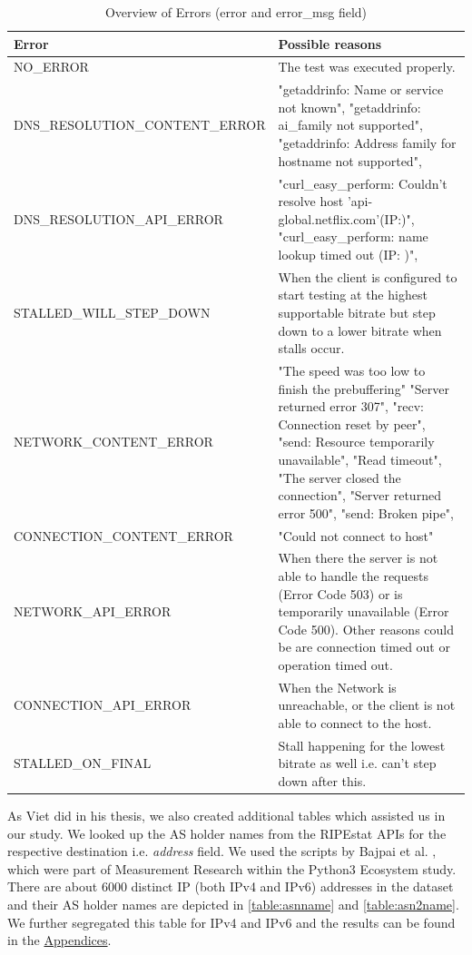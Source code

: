 \begin{table}[!ht]
	\centering
	\caption{Overview of Errors (error and error\_msg field)}
	\label{table:errors}
	\begin{tabular}{lp{8cm}}
  		\toprule
  		\textbf{Error} & \textbf{Possible reasons} \\ 
  		\midrule
  		NO\_ERROR & The test was executed properly. \\ 
  		DNS\_RESOLUTION\_CONTENT\_ERROR & "getaddrinfo: Name or service not known", 
"getaddrinfo: ai\_family not supported", 
"getaddrinfo: Address family for hostname not supported", 
 \\ 
		DNS\_RESOLUTION\_API\_ERROR & "curl\_easy\_perform: Couldn't resolve host 'api-global.netflix.com'(IP:)", 
"curl\_easy\_perform: name lookup timed out (IP: )", 
 \\ 
		STALLED\_WILL\_STEP\_DOWN & When the client is configured to start testing at the highest supportable bitrate but step down to a lower bitrate when stalls occur. \\ 
		NETWORK\_CONTENT\_ERROR & "The speed was too low to finish the prebuffering"
"Server returned error 307", 
"recv: Connection reset by peer", 
"send: Resource temporarily unavailable", 
"Read timeout", 
"The server closed the connection", 
"Server returned error 500", 
"send: Broken pipe", 
 \\ 
		CONNECTION\_CONTENT\_ERROR & "Could not connect to host"
 \\ 
		NETWORK\_API\_ERROR & When there the server is not able to handle the requests (Error Code 503) or is temporarily unavailable (Error Code 500). Other reasons could be are connection timed out or operation timed out.  \\  
		CONNECTION\_API\_ERROR & When the Network is unreachable, or the client is not able to connect to the host.  \\ 
		STALLED\_ON\_FINAL & Stall happening for the lowest bitrate as well i.e. can’t step down after this. \\
  		\bottomrule
\end{tabular}
\end{table}

\FloatBarrier

As Viet \cite{viet} did in his thesis, we also created additional tables which assisted us in our study. 
We looked up the AS holder names from the RIPEstat \cite{ripestat} APIs for the respective destination i.e. \textit{address} field. We used the scripts by Bajpai et al. \cite{bajpairipe}, 
which were part of Measurement Research within the Python3 Ecosystem study. There are about 6000 distinct IP (both IPv4 and IPv6) addresses in the dataset and their AS holder names are depicted in \cref{table:asnname} and \cref{table:asn2name}. We further segregated this table for IPv4 and IPv6 and the results can be found in the \hyperref[chapter:appendix]{Appendices}.

